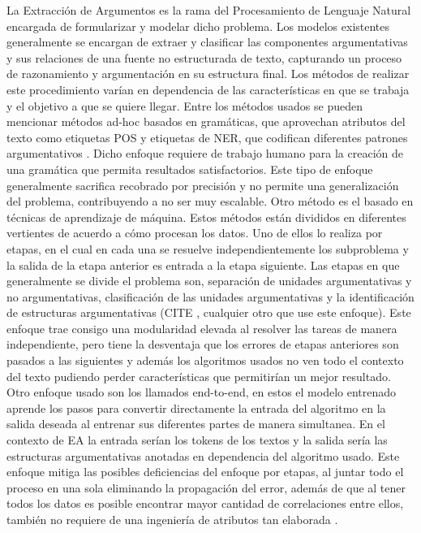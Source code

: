 La Extracción de Argumentos es la rama del Procesamiento de Lenguaje Natural encargada de formularizar
y modelar dicho problema. Los modelos existentes generalmente se encargan de
extraer y clasificar las componentes argumentativas y sus relaciones de una fuente no estructurada de 
texto, capturando un proceso de razonamiento y argumentación en su estructura final. Los métodos
de realizar este procedimiento varían en dependencia de las características en que se trabaja y el objetivo
a que se quiere llegar. Entre los métodos usados se pueden mencionar métodos ad-hoc basados en gramáticas,
que aprovechan atributos del texto como etiquetas POS y etiquetas de NER, que codifican diferentes 
patrones argumentativos \cite{dykes2020reconstructing}. Dicho enfoque requiere de trabajo 
humano para la creación de una gramática que permita resultados satisfactorios. Este tipo de enfoque
generalmente sacrifica recobrado por precisión y no permite una generalización del problema, contribuyendo
a no ser muy escalable. Otro método es el basado en técnicas de aprendizaje de máquina. Estos métodos están
divididos en diferentes vertientes de acuerdo a cómo procesan los datos. Uno de ellos lo realiza por
etapas, en el cual en cada una se resuelve independientemente los subproblema y la salida de la etapa 
anterior es entrada a la etapa siguiente. Las etapas en que generalmente se divide el problema
son, separación de unidades argumentativas y no argumentativas, clasificación de las unidades 
argumentativas y la identificación de estructuras argumentativas (CITE \cite{stab2014identifying}, cualquier otro que use este enfoque).
Este enfoque trae consigo una modularidad elevada al resolver las tareas de manera independiente, pero
tiene la desventaja que los errores de etapas anteriores son pasados a las siguientes y además los algoritmos
usados no ven todo el contexto del texto pudiendo perder características que permitirían un mejor resultado.
Otro enfoque usado son los llamados end-to-end, en estos el modelo entrenado aprende los pasos para convertir
directamente la entrada del algoritmo en la salida deseada al entrenar sus diferentes partes de manera 
simultanea. En el contexto de EA la entrada serían los tokens de los textos y la salida sería las
estructuras argumentativas anotadas en dependencia del algoritmo usado. Este enfoque mitiga las posibles
deficiencias del enfoque por etapas, al juntar todo el proceso en una sola eliminando la propagación
del error, además de que al tener todos los datos es posible encontrar mayor cantidad de correlaciones 
entre ellos, también no requiere de una ingeniería de atributos tan elaborada \cite{eger2017neural}.

